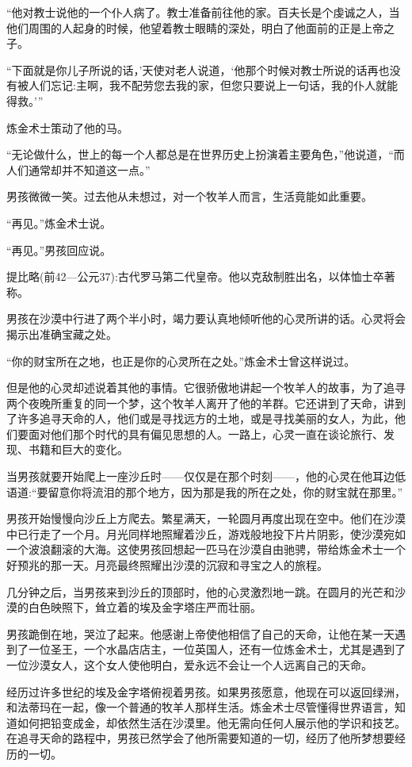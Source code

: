 \documentclass[twoside,openany]{book}
\begin{document}
“他对教士说他的一个仆人病了。教士准备前往他的家。百夫长是个虔诚之人，当他们周围的人起身的时候，他望着教士眼睛的深处，明白了他面前的正是上帝之子。

“下面就是你儿子所说的话，'天使对老人说道，‘他那个时候对教士所说的话再也没有被人们忘记:主啊，我不配劳您去我的家，但您只要说上一句话，我的仆人就能得救。'”

炼金术士策动了他的马。

“无论做什么，世上的每一个人都总是在世界历史上扮演着主要角色，”他说道，“而人们通常却并不知道这一点。”

男孩微微一笑。过去他从未想过，对一个牧羊人而言，生活竟能如此重要。

“再见。”炼金术士说。

“再见。”男孩回应说。

提比略(前42—公元37):古代罗马第二代皇帝。他以克敌制胜出名，以体恤士卒著称。

男孩在沙漠中行进了两个半小时，竭力要认真地倾听他的心灵所讲的话。心灵将会揭示出准确宝藏之处。

“你的财宝所在之地，也正是你的心灵所在之处。”炼金术士曾这样说过。

但是他的心灵却述说着其他的事情。它很骄傲地讲起一个牧羊人的故事，为了追寻两个夜晚所重复的同一个梦，这个牧羊人离开了他的羊群。它还讲到了天命，讲到了许多追寻天命的人，他们或是寻找远方的土地，或是寻找美丽的女人，为此，他们要面对他们那个时代的具有偏见思想的人。一路上，心灵一直在谈论旅行、发现、书籍和巨大的变化。

当男孩就要开始爬上一座沙丘时——仅仅是在那个时刻——，他的心灵在他耳边低语道:“要留意你将流泪的那个地方，因为那是我的所在之处，你的财宝就在那里。”

男孩开始慢慢向沙丘上方爬去。繁星满天，一轮圆月再度出现在空中。他们在沙漠中已行走了一个月。月光同样地照耀着沙丘，游戏般地投下片片阴影，使沙漠宛如一个波浪翻滚的大海。这使男孩回想起一匹马在沙漠自由驰骋，带给炼金术士一个好预兆的那一天。月亮最终照耀出沙漠的沉寂和寻宝之人的旅程。

几分钟之后，当男孩来到沙丘的顶部时，他的心灵激烈地一跳。在圆月的光芒和沙漠的白色映照下，耸立着的埃及金字塔庄严而壮丽。

男孩跪倒在地，哭泣了起来。他感谢上帝使他相信了自己的天命，让他在某一天遇到了一位圣王，一个水晶店店主，一位英国人，还有一位炼金术士，尤其是遇到了一位沙漠女人，这个女人使他明白，爱永远不会让一个人远离自己的天命。

经历过许多世纪的埃及金字塔俯视着男孩。如果男孩愿意，他现在可以返回绿洲，和法蒂玛在一起，像一个普通的牧羊人那样生活。炼金术士尽管懂得世界语言，知道如何把铅变成金，却依然生活在沙漠里。他无需向任何人展示他的学识和技艺。在追寻天命的路程中，男孩已然学会了他所需要知道的一切，经历了他所梦想要经历的一切。
\end{document}
